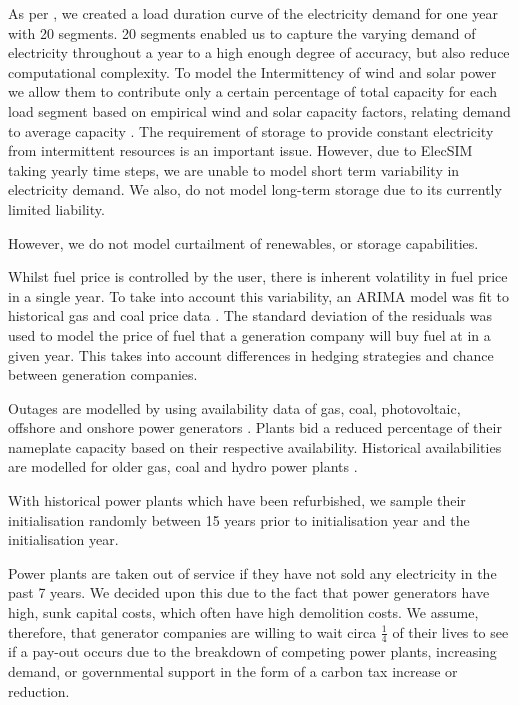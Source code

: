 As per \cite{Chappin2017}, we created a load duration curve of the electricity demand for one year with 20 segments. 20 segments enabled us to capture the varying demand of electricity throughout a year to a high enough degree of accuracy, but also reduce computational complexity. To model the Intermittency of wind and solar power we allow them to contribute only a certain percentage of total capacity for each load segment based on empirical wind and solar capacity factors, relating demand to average capacity \cite{Pfenninger2016, Staffell2016, Chappin2017}. The requirement of storage to provide constant electricity from intermittent resources is an important issue. However, due to ElecSIM taking yearly time steps, we are unable to model short term variability in electricity demand. We also, do not model long-term storage due to its currently limited liability. 

However, we do not model curtailment of renewables, or storage capabilities. 

Whilst fuel price is controlled by the user, there is inherent volatility in fuel price in a single year. To take into account this variability, an ARIMA model was fit to historical gas and coal price data \cite{coalprices,gasprices}. The standard deviation of the residuals was used to model the price of fuel that a generation company will buy fuel at in a given year. This takes into account differences in hedging strategies and chance between generation companies.

Outages are modelled by using availability data of gas, coal, photovoltaic, offshore and onshore power generators \cite{Ltd2016, Hunt2015, carroll-j}. Plants bid a reduced percentage of their nameplate capacity based on their respective availability. Historical availabilities are modelled for older gas, coal and hydro power plants \cite{AlbertaSystemElectricOperator2016}.

With historical power plants which have been refurbished, we sample their initialisation randomly between 15 years prior to initialisation year and the initialisation year.

Power plants are taken out of service if they have not sold any electricity in the past 7 years. We decided upon this due to the fact that power generators have high, sunk capital costs, which often have high demolition costs. We assume, therefore, that generator companies are willing to wait circa $\frac{1}{4}$ of their lives to see if a pay-out occurs due to the breakdown of competing power plants, increasing demand, or governmental support in the form of a carbon tax increase or reduction.


